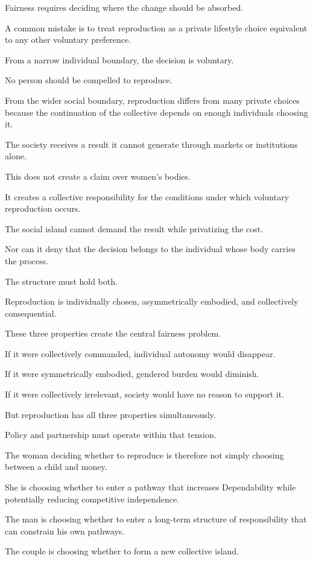 Fairness requires deciding where the change should be absorbed.

A common mistake is to treat reproduction as a private lifestyle choice equivalent to any other voluntary preference.

From a narrow individual boundary, the decision is voluntary.

No person should be compelled to reproduce.

From the wider social boundary, reproduction differs from many private choices because the continuation of the collective depends on enough individuals choosing it.

The society receives a result it cannot generate through markets or institutions alone.

This does not create a claim over women’s bodies.

It creates a collective responsibility for the conditions under which voluntary reproduction occurs.

The social island cannot demand the result while privatizing the cost.

Nor can it deny that the decision belongs to the individual whose body carries the process.

The structure must hold both.

Reproduction is individually chosen, asymmetrically embodied, and collectively consequential.

These three properties create the central fairness problem.

If it were collectively commanded, individual autonomy would disappear.

If it were symmetrically embodied, gendered burden would diminish.

If it were collectively irrelevant, society would have no reason to support it.

But reproduction has all three properties simultaneously.

Policy and partnership must operate within that tension.

The woman deciding whether to reproduce is therefore not simply choosing between a child and money.

She is choosing whether to enter a pathway that increases Dependability while potentially reducing competitive independence.

The man is choosing whether to enter a long-term structure of responsibility that can constrain his own pathways.

The couple is choosing whether to form a new collective island.

